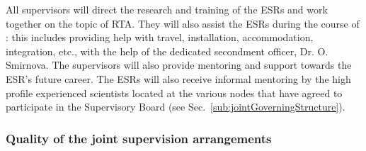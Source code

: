 %
%
%
%

All supervisors will direct the research and training of the ESRs and work together on the topic
of RTA. They will also assist the ESRs during the course of \acronym:
this includes providing help with travel, installation, accommodation, integration, etc., 
with the help of the dedicated secondment officer, Dr. O. Smirnova. The supervisors 
will also provide mentoring and support towards the ESR's future career. 
The ESRs will also receive informal mentoring by the high profile experienced scientists
located at the various nodes that have agreed to participate in the Supervisory Board
(see Sec.~\ref{sub:jointGoverningStructure}). 

\vskip-10pt

\subsubsection{Quality of the joint supervision arrangements}
\label{sec:jointsuperqual}


